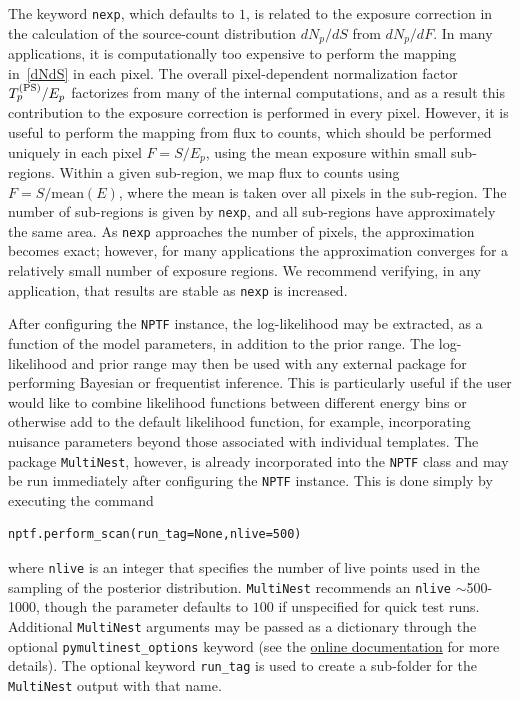 The keyword \lstinline{nexp}, which defaults to $1$, is related to the exposure correction in the calculation of the source-count distribution $dN_p/dS$ from $dN_p/dF$.  In many applications, it is computationally too expensive to perform the mapping in~\eqref{dNdS} in each pixel.  The overall pixel-dependent normalization factor $T_p^{({\rm PS})} / E_p$ factorizes from many of the internal computations, and as a result this contribution to the exposure correction is performed in every pixel.  However, it is useful to perform the mapping from flux to counts, which should be performed uniquely in each pixel $F = S / E_p$, using the mean exposure within small sub-regions.  Within a given sub-region, we map flux to counts using $F = S / \text{mean}(E)$, where the mean is taken over all pixels in the sub-region.  The number of sub-regions is given by \lstinline{nexp}, and all sub-regions have approximately the same area.  As \lstinline{nexp} approaches the number of pixels, the approximation becomes exact; however, for many applications the approximation converges for a relatively small number of exposure regions.  We recommend verifying, in any application, that results are stable as \lstinline{nexp} is increased.        

After configuring the \lstinline{NPTF} instance, the log-likelihood may be extracted, as a function of the model parameters, in addition to the prior range.  The log-likelihood and prior range may then be used with any external package for performing Bayesian or frequentist inference.  This is particularly useful if the user would like to combine likelihood functions between different energy bins or otherwise add to the default likelihood function, for example, incorporating nuisance parameters beyond those associated with individual templates.   The package \texttt{MultiNest}, however, is already incorporated into the \lstinline{NPTF} class and may be run immediately after configuring the \lstinline{NPTF} instance.  This is done simply by executing the command
\begin{lstlisting}
nptf.perform_scan(run_tag=None,nlive=500)
\end{lstlisting}
where \lstinline{nlive} is an integer that specifies the number of live points used in the sampling of the posterior distribution.  \texttt{MultiNest} recommends an \lstinline{nlive} $\sim$500-1000, though the parameter defaults to $100$ if unspecified for quick test runs.  Additional \texttt{MultiNest} arguments may be passed as a dictionary through the optional \lstinline{pymultinest_options} keyword (see the \href{http://nptfit.readthedocs.io}{online documentation} for more details).  The optional keyword \lstinline{run_tag} is used to create a sub-folder for the \texttt{MultiNest} output with that name.

